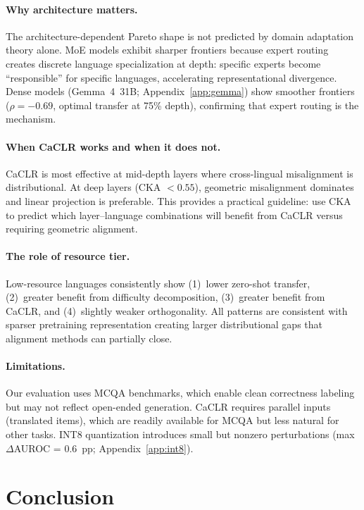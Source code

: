 \documentclass[11pt,a4paper]{article}
\begin{document}
\paragraph{Why architecture matters.}
The architecture-dependent Pareto shape is not predicted by domain adaptation theory alone.
MoE models exhibit sharper frontiers because expert routing creates discrete language specialization at depth: specific experts become ``responsible'' for specific languages, accelerating representational divergence.
Dense models (Gemma~4~31B; Appendix~\ref{app:gemma}) show smoother frontiers ($\rho = -0.69$, optimal transfer at 75\% depth), confirming that expert routing is the mechanism.

\paragraph{When CaCLR works and when it does not.}
CaCLR is most effective at mid-depth layers where cross-lingual misalignment is distributional.
At deep layers (CKA $< 0.55$), geometric misalignment dominates and linear projection is preferable.
This provides a practical guideline: use CKA to predict which layer--language combinations will benefit from CaCLR versus requiring geometric alignment.

\paragraph{The role of resource tier.}
Low-resource languages consistently show (1)~lower zero-shot transfer, (2)~greater benefit from difficulty decomposition, (3)~greater benefit from CaCLR, and (4)~slightly weaker orthogonality.
All patterns are consistent with sparser pretraining representation creating larger distributional gaps that alignment methods can partially close.

\paragraph{Limitations.}
Our evaluation uses MCQA benchmarks, which enable clean correctness labeling but may not reflect open-ended generation.
CaCLR requires parallel inputs (translated items), which are readily available for MCQA but less natural for other tasks.
INT8 quantization introduces small but nonzero perturbations (max $\Delta$AUROC = 0.6~pp; Appendix~\ref{app:int8}).

\section{Conclusion}
\label{sec:conclusion}
\end{document}
